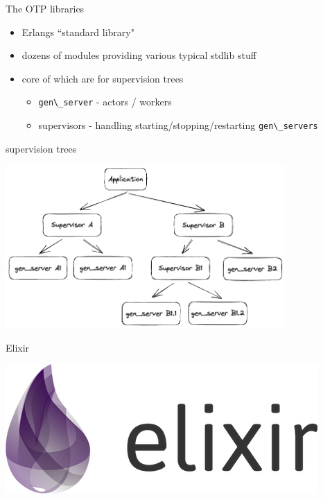 \documentclass[
  ignorenonframetext,
  aspectratio=169]{beamer}
\newcommand{\passthrough}[1]{#1}
\providecommand{\tightlist}{%
  \setlength{\itemsep}{0pt}\setlength{\parskip}{0pt}}
\begin{document}
\begin{frame}[fragile]{The OTP libraries}
\label{the-otp-libraries}
\begin{itemize}
\tightlist
\item
  Erlang\textquotesingle s ``standard library"
\item
  dozens of modules providing various typical stdlib stuff
\item
  core of which are for supervision trees

  \begin{itemize}
  \tightlist
  \item
    \passthrough{\lstinline!gen\_server!} - actors / workers
  \item
    supervisors - handling starting/stopping/restarting
    \passthrough{\lstinline!gen\_servers!}
  \end{itemize}
\end{itemize}
\end{frame}

\begin{frame}{supervision trees}
\label{supervision-trees}
\begin{center}
\includegraphics[width=0.8\textwidth]{./img/tree.png}
\end{center}
\end{frame}

\begin{frame}{Elixir}
\label{elixir}
\begin{center}
\includegraphics[width=.5\textwidth]{./img/elixir_logo.png}
\end{center}
\end{frame}
\end{document}
